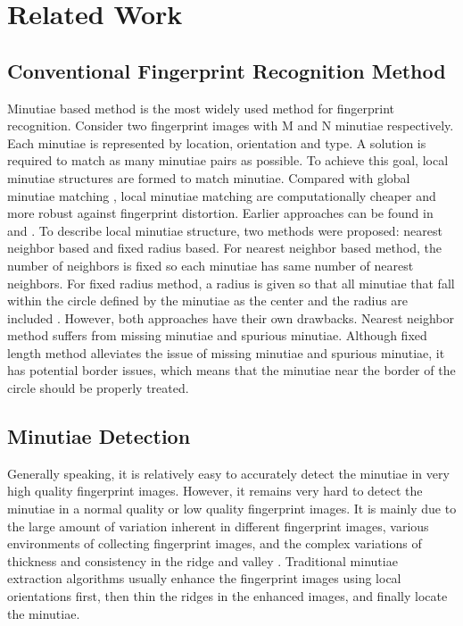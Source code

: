 \section{Related Work}
\label{sec:related}

\subsection{Conventional Fingerprint Recognition Method}

Minutiae based method is the most widely used method for fingerprint recognition. Consider two fingerprint images with M and N minutiae respectively. Each minutiae is represented by location, orientation and type. A solution is required to match as many minutiae pairs as possible. To achieve this goal, local minutiae structures are formed to match minutiae. Compared with global minutiae matching \cite{ChikkerurICB2006}, local minutiae matching are computationally cheaper and more robust against fingerprint distortion. Earlier approaches can be found in \cite{HrechakPR1990} and \cite{KovacsTPAMI2000}. To describe local minutiae structure, two methods were proposed: nearest neighbor based and fixed radius based. For nearest neighbor based method, the number of neighbors is fixed \cite{JiangICPR2000} so each minutiae has same number of nearest neighbors. For fixed radius method, a radius is given so that all minutiae that fall within the circle defined by the minutiae as the center and the radius are included \cite{CappelliTPAMI2010mcc}. However, both approaches have their own drawbacks. Nearest neighbor method suffers from missing minutiae and spurious minutiae. Although fixed length method alleviates the issue of missing minutiae and spurious minutiae, it has potential border issues, which means that the minutiae near the border of the circle should be properly treated.

\subsection{Minutiae Detection}

Generally speaking, it is relatively easy to accurately detect the minutiae in very high quality fingerprint images.
However, it remains very hard to detect the minutiae in a normal quality or low quality fingerprint images.
It is mainly due to the large amount of variation inherent in different fingerprint images, various environments of collecting fingerprint images, and the complex variations of thickness and consistency in the ridge and valley \cite{darlowFingerprintMinutiaeExtraction2017a}.
Traditional minutiae extraction algorithms usually enhance the fingerprint images using local orientations first, then thin the ridges in the enhanced images, and finally locate the minutiae.

